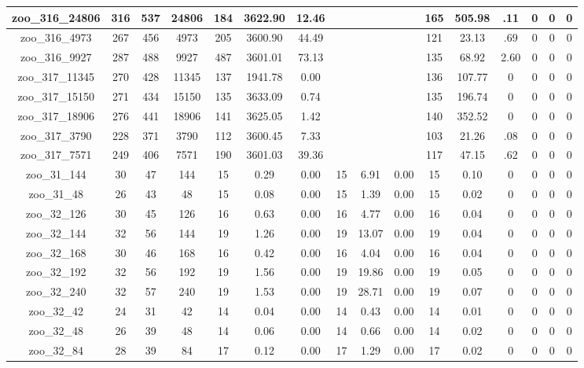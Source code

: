 \begin{landscape}
\begin{longtable}{|c|c|c|c|c|c|c|c|c|c|c|c|c|c|c|c|}
zoo\_316\_24806 & 316 & 537 & 24806 & 184 & 3622.90 & 12.46 &  &  &  & 165 & 505.98 & .11 & 0 & 0 & 0 \\ \hline 
zoo\_316\_4973 & 267 & 456 & 4973 & 205 & 3600.90 & 44.49 &  &  &  & 121 & 23.13 & .69 & 0 & 0 & 0 \\ \hline 
zoo\_316\_9927 & 287 & 488 & 9927 & 487 & 3601.01 & 73.13 &  &  &  & 135 & 68.92 & 2.60 & 0 & 0 & 0 \\ \hline 
zoo\_317\_11345 & 270 & 428 & 11345 & 137 & 1941.78 & 0.00 &  &  &  & 136 & 107.77 & 0 & 0 & 0 & 0 \\ \hline 
zoo\_317\_15150 & 271 & 434 & 15150 & 135 & 3633.09 & 0.74 &  &  &  & 135 & 196.74 & 0 & 0 & 0 & 0 \\ \hline 
zoo\_317\_18906 & 276 & 441 & 18906 & 141 & 3625.05 & 1.42 &  &  &  & 140 & 352.52 & 0 & 0 & 0 & 0 \\ \hline 
zoo\_317\_3790 & 228 & 371 & 3790 & 112 & 3600.45 & 7.33 &  &  &  & 103 & 21.26 & .08 & 0 & 0 & 0 \\ \hline 
zoo\_317\_7571 & 249 & 406 & 7571 & 190 & 3601.03 & 39.36 &  &  &  & 117 & 47.15 & .62 & 0 & 0 & 0 \\ \hline 
zoo\_31\_144 & 30 & 47 & 144 & 15 & 0.29 & 0.00 & 15 & 6.91 & 0.00 & 15 & 0.10 & 0 & 0 & 0 & 0 \\ \hline 
zoo\_31\_48 & 26 & 43 & 48 & 15 & 0.08 & 0.00 & 15 & 1.39 & 0.00 & 15 & 0.02 & 0 & 0 & 0 & 0 \\ \hline 
zoo\_32\_126 & 30 & 45 & 126 & 16 & 0.63 & 0.00 & 16 & 4.77 & 0.00 & 16 & 0.04 & 0 & 0 & 0 & 0 \\ \hline 
zoo\_32\_144 & 32 & 56 & 144 & 19 & 1.26 & 0.00 & 19 & 13.07 & 0.00 & 19 & 0.04 & 0 & 0 & 0 & 0 \\ \hline 
zoo\_32\_168 & 30 & 46 & 168 & 16 & 0.42 & 0.00 & 16 & 4.04 & 0.00 & 16 & 0.04 & 0 & 0 & 0 & 0 \\ \hline 
zoo\_32\_192 & 32 & 56 & 192 & 19 & 1.56 & 0.00 & 19 & 19.86 & 0.00 & 19 & 0.05 & 0 & 0 & 0 & 0 \\ \hline 
zoo\_32\_240 & 32 & 57 & 240 & 19 & 1.53 & 0.00 & 19 & 28.71 & 0.00 & 19 & 0.07 & 0 & 0 & 0 & 0 \\ \hline 
zoo\_32\_42 & 24 & 31 & 42 & 14 & 0.04 & 0.00 & 14 & 0.43 & 0.00 & 14 & 0.01 & 0 & 0 & 0 & 0 \\ \hline 
zoo\_32\_48 & 26 & 39 & 48 & 14 & 0.06 & 0.00 & 14 & 0.66 & 0.00 & 14 & 0.02 & 0 & 0 & 0 & 0 \\ \hline 
zoo\_32\_84 & 28 & 39 & 84 & 17 & 0.12 & 0.00 & 17 & 1.29 & 0.00 & 17 & 0.02 & 0 & 0 & 0 & 0 \\ \hline 

\end{longtable}
\end{landscape}
